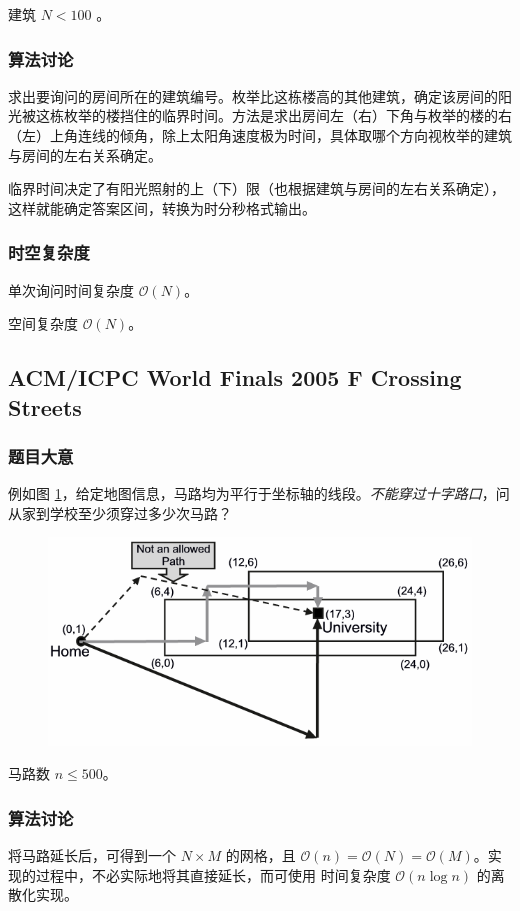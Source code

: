 				建筑 $N < 100$
				。
			\subsubsection{算法讨论}
				求出要询问的房间所在的建筑编号。枚举比这栋楼高的其他建筑，确定该房间的阳光被这栋枚举的楼挡住的临界时间。方法是求出房间左（右）下角与枚举的楼的右（左）上角连线的倾角，除上太阳角速度极为时间，具体取哪个方向视枚举的建筑与房间的左右关系确定。
				
				临界时间决定了有阳光照射的上（下）限（也根据建筑与房间的左右关系确定），这样就能确定答案区间，转换为时分秒格式输出。
			\subsubsection{时空复杂度}
				单次询问时间复杂度 $\mathcal{O}\left(N \right)$。
					
				空间复杂度 $\mathcal{O}\left(N\right)$。

\newpage
		\subsection{ACM/ICPC World Finals 2005 F Crossing Streets}
			\subsubsection{题目大意}
				例如图 \ref{2005f}，给定地图信息，马路均为平行于坐标轴的线段。\emph{不能穿过十字路口}，问从家到学校至少须穿过多少次马路？
				\begin{figure}[htb]
					\centering
					\includegraphics[width=0.7 \textwidth]{2005f.png}
					\caption{} \label{2005f}
				\end{figure}
				
				马路数 $n \le 500$。
			
			\subsubsection{算法讨论}
				将马路延长后，可得到一个 $N \times M$ 的网格，且  $\mathcal{O}(n) = \mathcal{O}(N) = \mathcal{O}(M) $。实现的过程中，不必实际地将其直接延长，而可使用 时间复杂度 $\mathcal{O}(n \log n)$ 的离散化实现。
				
